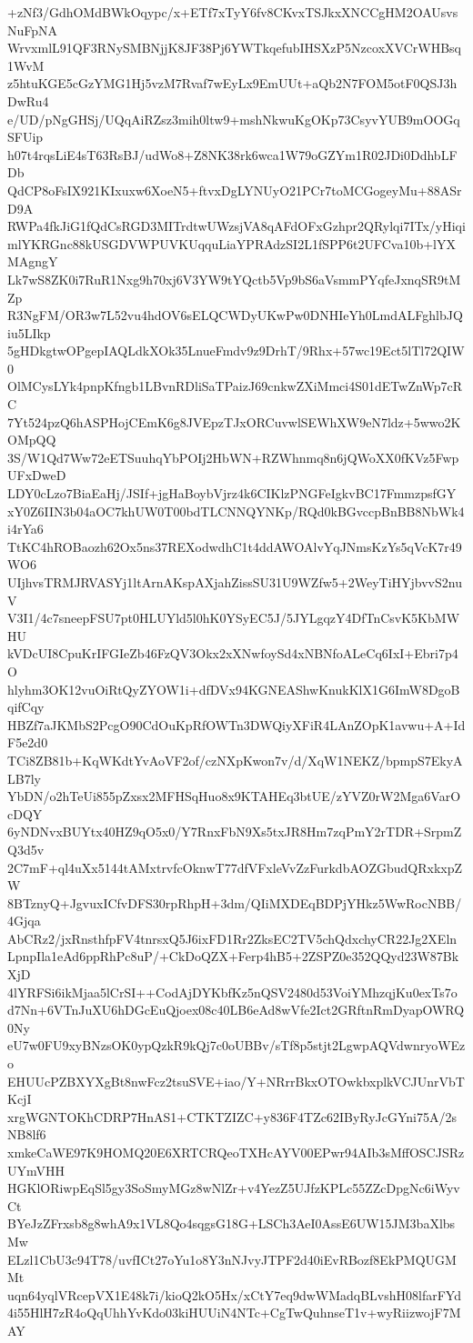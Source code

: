 +zNf3/GdhOMdBWkOqypc/x+ETf7xTyY6fv8CKvxTSJkxXNCCgHM2OAUsvsNuFpNA
WrvxmlL91QF3RNySMBNjjK8JF38Pj6YWTkqefubIHSXzP5NzcoxXVCrWHBsq1WvM
z5htuKGE5cGzYMG1Hj5vzM7Rvaf7wEyLx9EmUUt+aQb2N7FOM5otF0QSJ3hDwRu4
e/UD/pNgGHSj/UQqAiRZsz3mih0ltw9+mshNkwuKgOKp73CsyvYUB9mOOGqSFUip
h07t4rqsLiE4sT63RsBJ/udWo8+Z8NK38rk6wca1W79oGZYm1R02JDi0DdhbLFDb
QdCP8oFsIX921KIxuxw6XoeN5+ftvxDgLYNUyO21PCr7toMCGogeyMu+88ASrD9A
RWPa4fkJiG1fQdCsRGD3MITrdtwUWzsjVA8qAFdOFxGzhpr2QRylqi7ITx/yHiqi
mlYKRGnc88kUSGDVWPUVKUqquLiaYPRAdzSI2L1fSPP6t2UFCva10b+lYXMAgngY
Lk7wS8ZK0i7RuR1Nxg9h70xj6V3YW9tYQctb5Vp9bS6aVsmmPYqfeJxnqSR9tMZp
R3NgFM/OR3w7L52vu4hdOV6sELQCWDyUKwPw0DNHIeYh0LmdALFghlbJQiu5LIkp
5gHDkgtwOPgepIAQLdkXOk35LnueFmdv9z9DrhT/9Rhx+57wc19Ect5lTl72QIW0
OlMCysLYk4pnpKfngb1LBvnRDliSaTPaizJ69cnkwZXiMmci4S01dETwZnWp7cRC
7Yt524pzQ6hASPHojCEmK6g8JVEpzTJxORCuvwlSEWhXW9eN7ldz+5wwo2KOMpQQ
3S/W1Qd7Ww72eETSuuhqYbPOIj2HbWN+RZWhnmq8n6jQWoXX0fKVz5FwpUFxDweD
LDY0cLzo7BiaEaHj/JSIf+jgHaBoybVjrz4k6CIKlzPNGFeIgkvBC17FmmzpsfGY
xY0Z6IIN3b04aOC7khUW0T00bdTLCNNQYNKp/RQd0kBGvccpBnBB8NbWk4i4rYa6
TtKC4hROBaozh62Ox5ns37REXodwdhC1t4ddAWOAlvYqJNmsKzYs5qVcK7r49WO6
UIjhvsTRMJRVASYj1ltArnAKspAXjahZissSU31U9WZfw5+2WeyTiHYjbvvS2nuV
V3I1/4c7sneepFSU7pt0HLUYld5l0hK0YSyEC5J/5JYLgqzY4DfTnCsvK5KbMWHU
kVDcUI8CpuKrIFGIeZb46FzQV3Okx2xXNwfoySd4xNBNfoALeCq6IxI+Ebri7p4O
hlyhm3OK12vuOiRtQyZYOW1i+dfDVx94KGNEAShwKnukKlX1G6ImW8DgoBqifCqy
HBZf7aJKMbS2PcgO90CdOuKpRfOWTn3DWQiyXFiR4LAnZOpK1avwu+A+IdF5e2d0
TCi8ZB81b+KqWKdtYvAoVF2of/czNXpKwon7v/d/XqW1NEKZ/bpmpS7EkyALB7ly
YbDN/o2hTeUi855pZxsx2MFHSqHuo8x9KTAHEq3btUE/zYVZ0rW2Mga6VarOcDQY
6yNDNvxBUYtx40HZ9qO5x0/Y7RnxFbN9Xs5txJR8Hm7zqPmY2rTDR+SrpmZQ3d5v
2C7mF+ql4uXx5144tAMxtrvfcOknwT77dfVFxleVvZzFurkdbAOZGbudQRxkxpZW
8BTznyQ+JgvuxICfvDFS30rpRhpH+3dm/QIiMXDEqBDPjYHkz5WwRocNBB/4Gjqa
AbCRz2/jxRnsthfpFV4tnrsxQ5J6ixFD1Rr2ZksEC2TV5chQdxchyCR22Jg2XEln
LpnpIla1eAd6ppRhPc8uP/+CkDoQZX+Ferp4hB5+2ZSPZ0e352QQyd23W87BkXjD
4lYRFSi6ikMjaa5lCrSI++CodAjDYKbfKz5nQSV2480d53VoiYMhzqjKu0exTs7o
d7Nn+6VTnJuXU6hDGcEuQjoex08c40LB6eAd8wVfe2Ict2GRftnRmDyapOWRQ0Ny
eU7w0FU9xyBNzsOK0ypQzkR9kQj7c0oUBBv/sTf8p5stjt2LgwpAQVdwnryoWEzo
EHUUcPZBXYXgBt8nwFcz2tsuSVE+iao/Y+NRrrBkxOTOwkbxplkVCJUnrVbTKcjI
xrgWGNTOKhCDRP7HnAS1+CTKTZIZC+y836F4TZc62IByRyJcGYni75A/2sNB8lf6
xmkeCaWE97K9HOMQ20E6XRTCRQeoTXHcAYV00EPwr94AIb3sMffOSCJSRzUYmVHH
HGKlORiwpEqSl5gy3SoSmyMGz8wNlZr+v4YezZ5UJfzKPLc55ZZcDpgNc6iWyvCt
BYeJzZFrxsb8g8whA9x1VL8Qo4sqgsG18G+LSCh3AeI0AssE6UW15JM3baXlbsMw
ELzl1CbU3c94T78/uvfICt27oYu1o8Y3nNJvyJTPF2d40iEvRBozf8EkPMQUGMMt
uqn64yqlVRcepVX1E48k7i/kioQ2kO5Hx/xCtY7eq9dwWMadqBLvshH08lfarFYd
4i55HlH7zR4oQqUhhYvKdo03kiHUUiN4NTc+CgTwQuhnseT1v+wyRiizwojF7MAY
